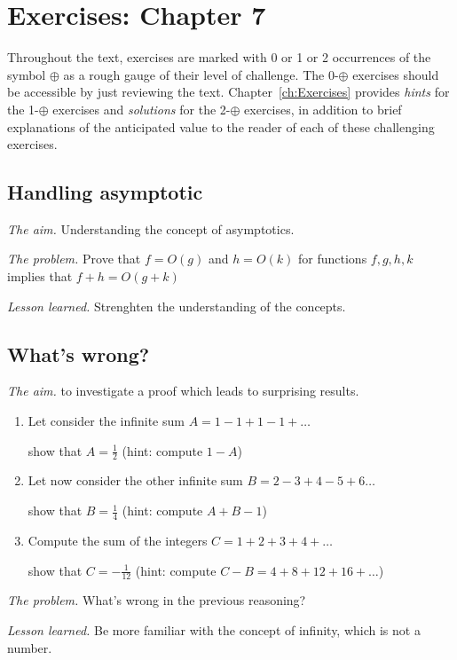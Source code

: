 
\section{Exercises: Chapter 7}

Throughout the text, exercises are marked with 0 or 1 or 2 occurrences
of the symbol $\oplus$ as a rough gauge of their level of challenge.
The 0-$\oplus$ exercises should be accessible by just reviewing the
text.  Chapter~\ref{ch:Exercises} provides {\em hints} for the
1-$\oplus$ exercises and {\em solutions} for the 2-$\oplus$ exercises,
in addition to brief explanations of the anticipated value to the
reader of each of these challenging exercises. 


\subsection{Handling asymptotic}

\noindent \textit{The aim.}
Understanding the concept of asymptotics.
\medskip

\noindent \textit{The problem.}
Prove that $f = O(g)$ and $h = O(k)$ for functions $f,g,h,k$ implies that
$f+h = O(g+k)$
\medskip

\noindent \textit{Lesson learned.}
Strenghten the understanding of the concepts. 


\subsection{What's wrong?}

\noindent \textit{The aim.}
to investigate a proof which leads to surprising results.

\begin{enumerate}
\item
Let consider the infinite sum $A = 1-1+1-1+ \ldots$

show that $A=\frac{1}{2}$ (hint: compute $1-A$)
\item
Let now consider the other infinite sum $B=2-3+4-5+6 \ldots$

show that $B=\frac{1}{4}$ (hint: compute $A+B-1$)
\item 
Compute the sum of the integers $C=1+2+3+4+ \ldots$

show that $C=-\frac{1}{12}$ (hint: compute $C-B=4+8+12+16+ \ldots$)
\end{enumerate}
\medskip

\noindent \textit{The problem.}
What's wrong in the previous reasoning?
\medskip

\noindent \textit{Lesson learned.}
Be more familiar with the concept of infinity, which is not a number.



